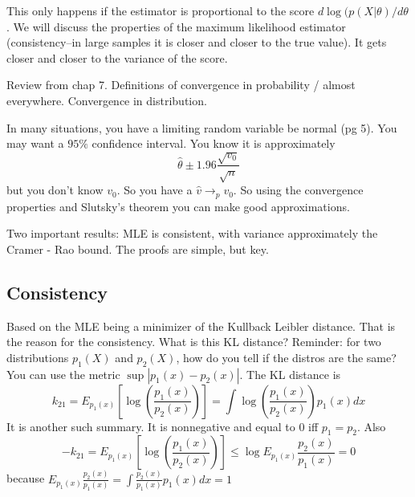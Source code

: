 \documentclass[letterpaper, 12pt]{article}
\theoremstyle{definition}
\theoremstyle{plain}
\begin{document}
This only happens if the estimator is proportional to the score $d \log (p(X | \theta) / d\theta$. We will discuss the properties of the maximum likelihood estimator (consistency--in large samples it is closer and closer to the true value). It gets closer and closer to the variance of the score.

Review from chap 7. Definitions of convergence in probability / almost everywhere. Convergence in distribution.

In many situations, you have a limiting random variable be normal (pg 5). You may want a $95\%$ confidence interval. You know it is approximately
\begin{equation}
\hat{\theta} \pm 1.96 \frac{\sqrt{v_0}}{\sqrt{n}}
\end{equation}
but you don't know $v_0$. So you have a $\hat{v} \to_p v_0$. So using the convergence properties and Slutsky's theorem you can make good approximations.

Two important results: MLE is consistent, with variance approximately the Cramer - Rao bound. The proofs are simple, but key.
\subsection*{Consistency}
Based on the MLE being a minimizer of the Kullback Leibler distance.
That is the reason for the consistency. What is this KL distance?
Reminder: for two distributions $p_1(X)$ and $p_2(X)$, how do you tell if the distros are the same? You can use the metric $\sup |p_1(x) - p_2(x)|$. The KL distance is
\begin{equation}
k_{21} = E_{p_1(x)} \left[ \log \left(   \frac{p_1(x)}{p_2(x)}       \right)     \right] = \int \log \left(   \frac{p_1(x)}{p_2(x)}       \right) p_1(x) dx
\end{equation}
It is another such summary. It is nonnegative and equal to 0 iff $p_1 = p_2$. Also
\begin{equation}
-k_{21} = E_{p_1(x)} \left[ \log \left(   \frac{p_1(x)}{p_2(x)}       \right)     \right] \leq \log E_{p_1(x)} \frac{p_2(x)}{p_1(x)} = 0
\end{equation}
because $E_{p_1(x)} \frac{p_2(x)}{p_1(x)} = \int  \frac{p_2(x)}{p_1(x)} p_1(x) dx = 1$
\end{document}

